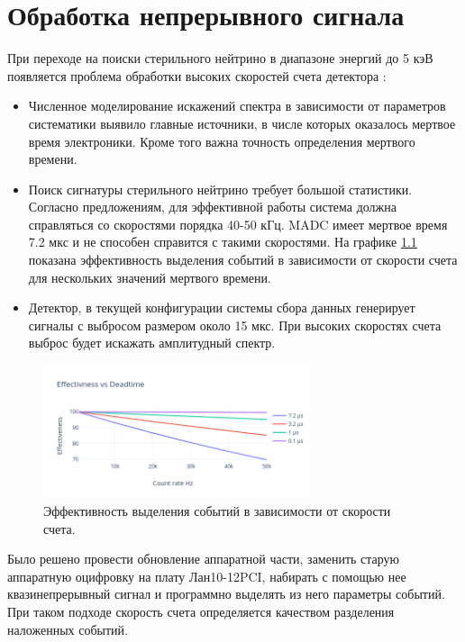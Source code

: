 \documentclass[a4paper,14pt]{extreport}
\begin{document}
\chapter{Обработка непрерывного сигнала}

При переходе на поиски стерильного нейтрино в диапазоне энергий до 5 кэВ появляется проблема обработки высоких скоростей счета детектора \cite{2015JInst..1010005A}:
\begin{itemize}
    \item Численное моделирование искажений спектра в зависимости от параметров систематики выявило главные источники, в числе которых оказалось мертвое время электроники. Кроме того важна точность определения мертвого времени.
    \item Поиск сигнатуры стерильного нейтрино требует большой статистики. Согласно предложениям, для эффективной работы система должна справляться со скоростями порядка 40-50 кГц. MADC имеет мертвое время 7.2 мкс и не способен справится с такими скоростями. На графике \ref{fig:cr-deadtime} показана эффективность выделения событий в зависимости от скорости счета для нескольких значений мертвого времени.
    \item Детектор, в текущей конфигурации системы сбора данных генерирует сигналы  с выбросом размером около 15 мкс. При высоких скоростях счета выброс будет искажать амплитудный спектр.
\end{itemize}

\begin{figure}
  \centering
  \includegraphics[width = 0.7\textwidth]{img/signals/cr_deadtime.png}
    \caption{Эффективность выделения событий в зависимости от скорости счета.}
    \label{fig:cr-deadtime}
\end{figure}

Было решено провести обновление аппаратной части, заменить старую аппаратную оцифровку на плату Лан10-12PCI, набирать с помощью нее квазинепрерывный сигнал и программно выделять из него параметры событий. При таком подходе скорость счета определяется качеством разделения наложенных событий. 
\end{document}
